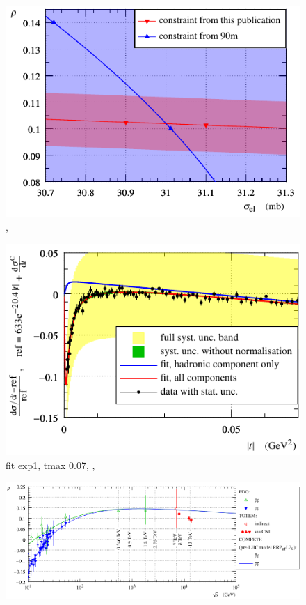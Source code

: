 \begin{figure}
\vskip-5mm
\begin{center}
\includegraphics{fig/si_el_rho_solution.pdf}
\caption{%
,
}
\label{fig:si_el rho sol}
\end{center}
\end{figure}





\begin{figure}
\vskip-5mm
\begin{center}
\includegraphics{fig/fit_details_exp1_0p07.pdf}
\caption{%
fit exp1, tmax 0.07,
,
}
\label{fig:fit exp1 0.07}
\end{center}
\end{figure}




\begin{figure}
\vskip-5mm
\begin{center}
\includegraphics{fig/rho_vs_s.pdf}
\caption{%
}
\label{fig:rho_vs_s}
\end{center}
\end{figure}
